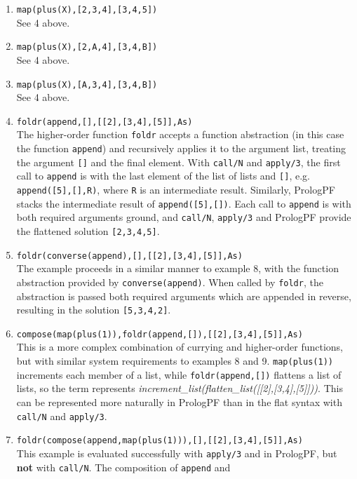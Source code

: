 \begin{enumerate}
\item{\texttt{map(plus(X),[2,3,4],[3,4,5])}\\
  See 4 above.}
\item{\texttt{map(plus(X),[2,A,4],[3,4,B])}\\
  See 4 above.}
\item{\texttt{map(plus(X),[A,3,4],[3,4,B])}\\
  See 4 above.}
\item{\texttt{foldr(append,[],[[2],[3,4],[5]],As)}\\
  The higher-order function \texttt{foldr} accepts a function abstraction
  (in this case the function \texttt{append}) and recursively applies it to
  the argument list, treating the argument \texttt{[]} and the final element.
  With \texttt{call/N} and \texttt{apply/3},
  the first call to \texttt{append} is with the last element of the list of lists 
  and \texttt{[]}, e.g. \texttt{append([5],[],R)}, where \texttt{R} is an intermediate
  result. Similarly, PrologPF stacks the intermediate result of
  \texttt{append([5],[])}.  Each call to \texttt{append} is with both required
  arguments ground, and \texttt{call/N}, \texttt{apply/3} and PrologPF provide the
  flattened solution \mbox{\texttt{[2,3,4,5]}}.}
\item{\texttt{foldr(converse(append),[],[[2],[3,4],[5]],As)}\\
  The example proceeds in a similar manner to example 8, with the function
  abstraction provided by \texttt{converse(append)}.  When called by
  \texttt{foldr}, the abstraction is passed both required arguments which are
  appended in reverse, resulting in the solution \texttt{[5,3,4,2]}.}
\item{\texttt{compose(map(plus(1)),foldr(append,[]),[[2],[3,4],[5]],As)}\\
  This is a more complex combination of currying and higher-order
  functions, but with similar system requirements to examples 8 and 9.
  \texttt{map(plus(1))} increments each member of a list, while 
  \texttt{foldr(append,[])} flattens a list of lists, so the term represents
  \mbox{\textit{increment\_{}list(flatten\_{}list([[2],[3,4],[5]]))}}.  This can be represented
  more naturally in PrologPF than in the flat syntax with \texttt{call/N} and
  \texttt{apply/3}.}
\item{\texttt{foldr(compose(append,map(plus(1))),[],[[2],[3,4],[5]],As)}\\
  This example is evaluated successfully with \texttt{apply/3} and in PrologPF,
  but \textbf{not} with \texttt{call/N}.  The composition of \texttt{append} and
}
\end{enumerate}
